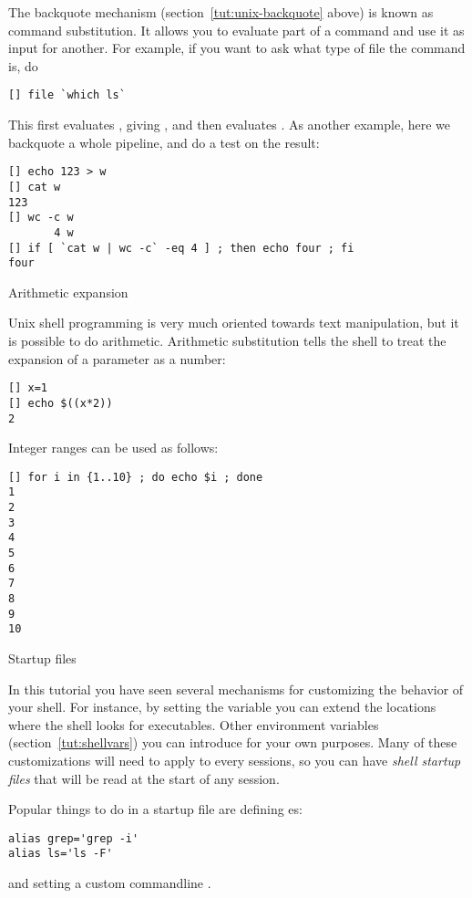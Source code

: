 The backquote mechanism (section~\ref{tut:unix-backquote} above)
is known as command substitution. It allows you to evaluate part
of a command and use it as input for another. For example,
if you want to ask what type of file the command  is, do
\begin{verbatim}
[] file `which ls`
\end{verbatim}
This first evaluates , giving , and then
evaluates . As another example, here
we backquote a whole pipeline, and do a test on the result:
\begin{verbatim}
[] echo 123 > w
[] cat w
123
[] wc -c w
       4 w
[] if [ `cat w | wc -c` -eq 4 ] ; then echo four ; fi
four
\end{verbatim}

 {Arithmetic expansion}
\label{sec:arith-expansion}

Unix shell programming is very much oriented towards text manipulation, but it 
is possible to do arithmetic. 
Arithmetic substitution tells the shell to treat the expansion of a
parameter as a number:
\begin{verbatim}
[] x=1
[] echo $((x*2))
2
\end{verbatim}

Integer ranges can be used as follows:
\begin{verbatim}
[] for i in {1..10} ; do echo $i ; done
1
2
3
4
5
6
7
8
9
10
\end{verbatim}

 {Startup files}

In this tutorial you have seen several mechanisms for customizing
the behavior of your shell. For instance, by setting the 
variable you can extend the locations where the shell looks for executables.
Other environment variables (section~\ref{tut:shellvars}) you can
introduce for your own purposes. Many of these customizations will
need to apply to every sessions, so you can have 
\emph{shell startup files} that will be read at the start of any session.

Popular things to do in a startup file are defining es:
\begin{verbatim}
alias grep='grep -i'
alias ls='ls -F'
\end{verbatim}
and setting a custom commandline .

